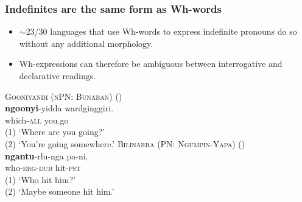 \documentclass{article}
\begin{document}
\subsubsection{Indefinites are the same form as Wh-words}
\begin{itemize}
\item $\sim$23/30 languages that use Wh-words to express indefinite pronouns do so without any additional morphology.
\item Wh-expressions can therefore be ambiguous between interrogative and declarative readings.
\end{itemize}
\begin{exe}
  \ex \textsc{Gooniyandi (nPN: Bunaban)} (\citealt[147]{mcgregor90})\\
  \gll \textbf{ngoonyi}-yidda wardginggiri.\\
  which-\textsc{all} you.go\\
  \glt (1)  `Where are you going?' \\
  (2) `You're going somewhere.'
  \ex \textsc{Bilinarra (PN: Ngumpin-Yapa)} (\citealt[37]{nordlinger90})\\
  \gll \textbf{ngantu}-rlu-nga pa-ni.\\
  who-\textsc{erg-dub} hit-\textsc{pst}\\
  \glt (1) `Who hit him?'\\
  (2) `Maybe someone hit him.'
\end{exe}
\end{document}
